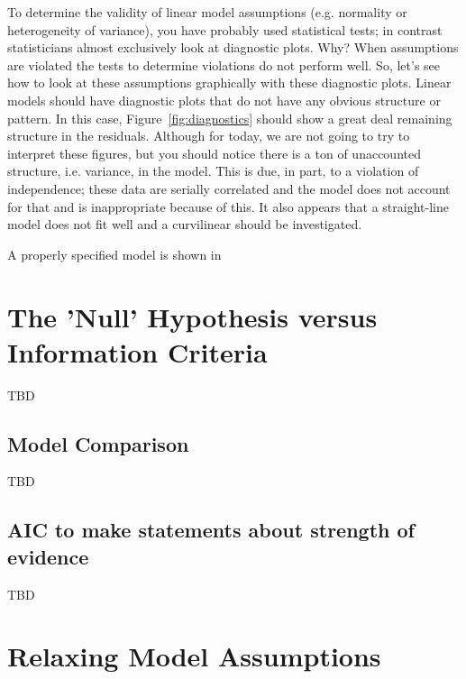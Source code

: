 \documentclass{article}\usepackage[]{graphicx}\usepackage[]{color}
\begin{document}
To determine the validity of linear model assumptions (e.g. normality or heterogeneity of variance), you have probably used statistical tests; in contrast statisticians almost exclusively look at diagnostic plots. Why?  When assumptions are violated the tests to determine violations do not perform well. So, let's see how to look at these assumptions graphically with these diagnostic plots. Linear models should have diagnostic plots that do not have any obvious structure or pattern. In this case, Figure~\ref{fig:diagnostics} should show a great deal remaining structure in the residuals. Although for today, we are not going to try to interpret these figures, but you should notice there is a ton of unaccounted structure, i.e. variance, in the model. This is due, in part, to a violation of independence; these data are serially correlated and the model does not account for that and is inappropriate because of this. It also appears that a straight-line model does not fit well and a curvilinear should be investigated.

A properly specified model is shown in 


\section{The 'Null' Hypothesis versus Information Criteria}

TBD

\subsection{Model Comparison}

TBD

\subsection{AIC to make statements about strength of evidence}

TBD

\section{Relaxing Model Assumptions}
\end{document}
